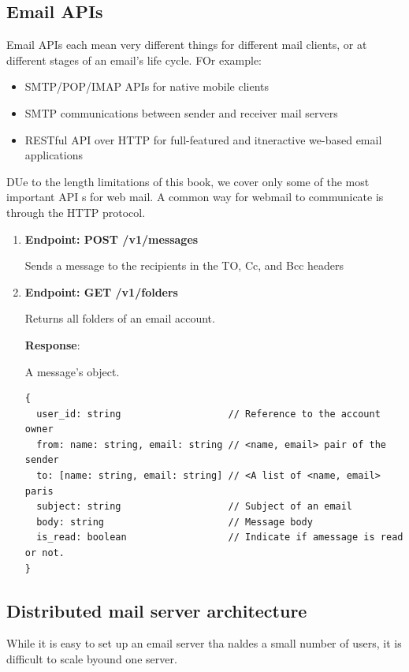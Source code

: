 \documentclass{report}
\theoremstyle{definition}
\let\oldsubsection\subsection
\renewcommand{\subsection}{\oldsubsection*}
\begin{document}
\subsection{Email APIs}

Email APIs each mean very different things for different mail clients, or at different stages of an email's life cycle. FOr example:

\begin{itemize}
\item
SMTP/POP/IMAP APIs for native mobile clients
\item
SMTP communications between sender and receiver mail servers
\item
RESTful API over HTTP for full-featured and itneractive we-based email applications
\end{itemize}

DUe to the length limitations of this book, we cover only some of the most important API s for web mail. A common way for webmail to communicate is through the HTTP protocol.

\begin{enumerate}
\item
\textbf{Endpoint: POST /v1/messages}

Sends a message to the recipients in the TO, Cc, and Bcc headers
\item
\textbf{Endpoint: GET /v1/folders}

Returns all folders of an email account.

\textbf{Response}:

A message's object.

\begin{lstlisting}
{
  user_id: string                   // Reference to the account owner
  from: name: string, email: string // <name, email> pair of the sender
  to: [name: string, email: string] // <A list of <name, email> paris
  subject: string                   // Subject of an email
  body: string                      // Message body
  is_read: boolean                  // Indicate if amessage is read or not.
}
\end{lstlisting}


\end{enumerate}

\subsection{Distributed mail server architecture}

While it is easy to set up an email server tha naldes a small number of users, it is difficult to scale byound one server.
\end{document}

